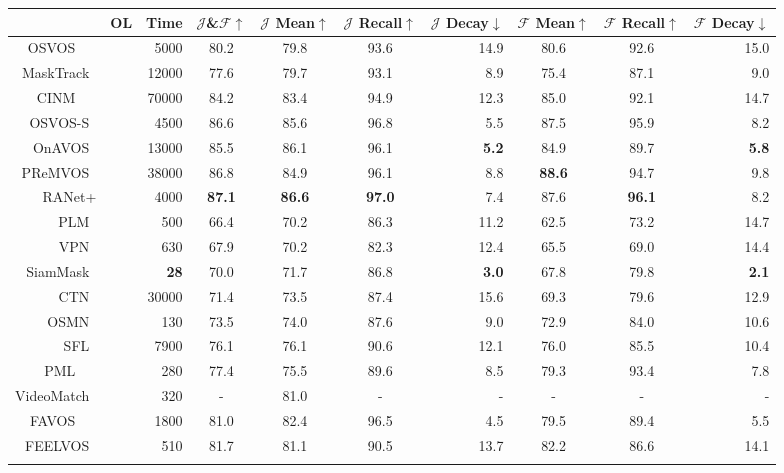 \documentclass[10pt,twocolumn,letterpaper]{article}
\newcommand{\cmark}{\ding{51}}\newcommand{\xmark}{\ding{55}}\usepackage{booktabs}
\begin{document}
\begin{table*}[htbp]
\vspace{-2mm}
\centering
\begin{tabular}{r||c|r|c|ccr|ccr}
\Xhline{1pt}
\rowcolor[rgb]{ .873,  .91,  0.95}
\multicolumn{1}{c||}{Method} & \multicolumn{1}{l|}{OL} & Time & $\mathcal{J}$\&$\mathcal{F}$$\uparrow$ & $\mathcal{J}$ Mean$\uparrow$ & $\mathcal{J}$ Recall$\uparrow$  & $\mathcal{J}$ Decay$\downarrow$  & $\mathcal{F}$ Mean$\uparrow$  & $\mathcal{F}$ Recall$\uparrow$  & $\mathcal{F}$ Decay$\downarrow$
\\
\hline
\hline
OSVOS\ \ ~\cite{osvos} & \cmark
& 5000 & 80.2 & 79.8 & 93.6 & 14.9 & 80.6 & 92.6 & 15.0
\\
\rowcolor[rgb]{ .94,  .94,  .94}
MaskTrack~\cite{masktrack}  & \cmark
& 12000 & 77.6 & 79.7 & 93.1 & 8.9  & 75.4 & 87.1 & 9.0
\\
CINM\ \ ~\cite{cinm} & \cmark
& 70000 & 84.2 & 83.4 & 94.9 & 12.3 & 85.0 & 92.1 & 14.7  
\\
\rowcolor[rgb]{ .94,  .94,  .94}
OSVOS-S~\cite{osvos-s} & \cmark
& 4500 & 86.6 & 85.6 & 96.8 & 5.5 & 87.5 & 95.9 & 8.2 
\\
OnAVOS~\cite{onavos} & \cmark
& 13000 & 85.5 & 86.1 & 96.1 & \textbf{5.2} & 84.9 & 89.7 & \textbf{5.8} 
\\
\rowcolor[rgb]{ .94,  .94,  .94}
PReMVOS~\cite{premvos} & \cmark
& 38000 & 86.8 & 84.9 & 96.1 & 8.8 & \textbf{88.6} & 94.7 & 9.8 
\\
\hline
RANet+ & \cmark
& 4000 &
\textbf{87.1} & \textbf{86.6} & \textbf{97.0} & 7.4 & 87.6 & \textbf{96.1} & 8.2
\\
\hline
\hline
\rowcolor[rgb]{ .94,  .94,  .94}
PLM~\cite{plm}  & \xmark
& 500 & 66.4 & 70.2 & 86.3 & 11.2 & 62.5 & 73.2 & 14.7
\\
VPN~\cite{vpn}  & \xmark     
& 630 & 67.9 & 70.2 & 82.3 & 12.4 & 65.5 & 69.0 & 14.4 
\\
\rowcolor[rgb]{ .94,  .94,  .94}
SiamMask~\cite{siammask} & \xmark   
& \textbf{28} & 70.0 & 71.7 & 86.8 & \textbf{3.0} & 67.8 & 79.8 & \textbf{2.1}  
\\
CTN~\cite{ctn}  & \xmark    
& 30000 & 71.4 & 73.5 & 87.4 & 15.6 & 69.3 & 79.6 & 12.9 
\\
\rowcolor[rgb]{ .94,  .94,  .94}
OSMN~\cite{osmn} & \xmark    
& 130 & 73.5 & 74.0 & 87.6 & 9.0 & 72.9 & 84.0 & 10.6
\\
SFL~\cite{sfl}  & \xmark     
& 7900 & 76.1 & 76.1 & 90.6 & 12.1 & 76.0   & 85.5 & 10.4
\\
\rowcolor[rgb]{ .94,  .94,  .94}
PML\ \ ~\cite{pml}  & \xmark    
& 280 & 77.4 & 75.5 & 89.6 & 8.5 & 79.3 & 93.4 & 7.8  
\\
VideoMatch~\cite{videomatch} & \xmark  
& 320    & -    & 81.0   & -    & -    & -    & -    & -   
\\
\rowcolor[rgb]{ .94,  .94,  .94}
FAVOS\ \ ~\cite{favos} & \xmark   
& 1800 & 81.0 & 82.4 & 96.5 & 4.5 & 79.5 & 89.4 & 5.5  
\\
FEELVOS~\cite{Voigtlaender2019FEELVOS} & \xmark  
& 510 & 81.7 & 81.1 & 90.5 & 13.7 & 82.2 & 86.6 & 14.1 
\\
\rowcolor[rgb]{ .94,  .94,  .94}



\end{tabular}
\end{table*}
\end{document}
